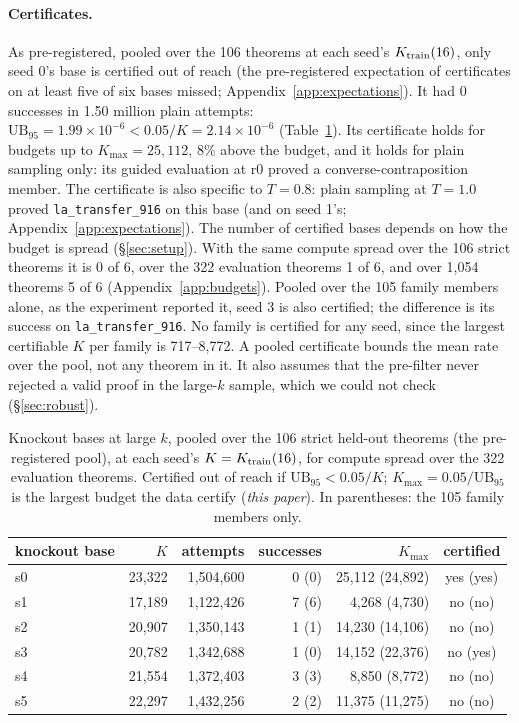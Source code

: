 \paragraph{Certificates.} As pre-registered, pooled over the 106 theorems at each seed's $K_{\mathrm{train}}(16)$, only seed 0's
base is certified out of reach \rv{} (the pre-registered expectation of certificates on at least five of six bases
missed; Appendix~\ref{app:expectations}). It had 0 successes in 1.50 million plain attempts: $\mathrm{UB}_{95} = 1.99\times10^{-6}
< 0.05/K = 2.14\times10^{-6}$ (Table~\ref{tab:certs}). Its certificate holds for budgets up to $K_{\max} = 25{,}112$, 8\%
above the budget, and it holds for plain sampling only: its guided evaluation at r0 proved a converse-contraposition
member. \rv{} The certificate is also specific to $T=0.8$: plain sampling at $T=1.0$ proved \texttt{la\_transfer\_916} on
this base (and on seed 1's; Appendix~\ref{app:expectations}). The number of certified bases depends on how the budget is spread (\S\ref{sec:setup}). With the same compute
spread over the 106 strict theorems it is 0 of 6, over the 322 evaluation theorems 1 of 6, and over 1,054 theorems 5 of 6
(Appendix~\ref{app:budgets}). Pooled over the 105 family members alone, as the experiment reported it, seed 3 is also
certified; the difference is its success on \texttt{la\_transfer\_916}. No family is certified for any seed, since the
largest certifiable $K$ per family is 717--8,772. A pooled certificate bounds the mean rate over the pool, not any
theorem in it. It also assumes that the pre-filter never rejected a valid proof in the large-$k$ sample, which we could
not check (\S\ref{sec:robust}).

\begin{table}[t]
\centering\small
\caption{Knockout bases at large $k$, pooled over the 106 strict held-out theorems (the pre-registered pool), at each
seed's $K = K_{\mathrm{train}}(16)$, for compute spread over the 322 evaluation theorems. Certified out of reach if
$\mathrm{UB}_{95} < 0.05/K$; $K_{\max} = 0.05/\mathrm{UB}_{95}$ is the largest budget the data certify (\emph{this
paper}). In parentheses: the 105 family members only.}
\label{tab:certs}
\begin{tabular}{lrrrrc}
\toprule
knockout base & $K$ & attempts & successes & $K_{\max}$ & certified \\
\midrule
s0 & 23,322 & 1,504,600 & 0 (0) & 25,112 (24,892) & yes (yes) \\
s1 & 17,189 & 1,122,426 & 7 (6) & 4,268 (4,730) & no (no) \\
s2 & 20,907 & 1,350,143 & 1 (1) & 14,230 (14,106) & no (no) \\
s3 & 20,782 & 1,342,688 & 1 (0) & 14,152 (22,376) & no (yes) \\
s4 & 21,554 & 1,372,403 & 3 (3) & 8,850 (8,772) & no (no) \\
s5 & 22,297 & 1,432,256 & 2 (2) & 11,375 (11,275) & no (no) \\
\bottomrule
\end{tabular}
\end{table}


